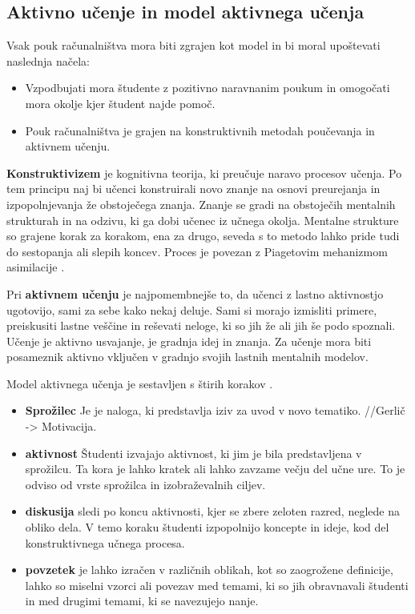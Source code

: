 \subsection{Aktivno učenje in model aktivnega učenja}
\label{sec:aktivno_učenje_in_model_aktivnega_učenja}

Vsak pouk računalništva mora biti zgrajen kot model in bi moral
upoštevati naslednja načela:
\begin{itemize}
\tightlist
\item Vzpodbujati mora študente z pozitivno naravnanim poukum in
   omogočati mora okolje kjer študent najde pomoč.
 \item Pouk računalništva je grajen na konstruktivnih metodah poučevanja
   in aktivnem učenju.
\end{itemize}

\textbf{Konstruktivizem} je kognitivna teorija, ki preučuje naravo
procesov učenja. Po tem principu naj bi učenci konstruirali novo
znanje na osnovi preurejanja in izpopolnjevanja že obstoječega
znanja. Znanje se gradi na obstoječih mentalnih strukturah in na
odzivu, ki ga dobi učenec iz učnega okolja. Mentalne strukture so
grajene korak za korakom, ena za drugo, seveda s to metodo lahko pride
tudi do sestopanja ali slepih koncev. Proces je povezan z Piagetovim
mehanizmom asimilacije \cite{guideTCS}.

Pri \textbf{aktivnem učenju} je najpomembnejše to, da učenci z lastno
aktivnostjo ugotovijo, sami za sebe kako nekaj deluje. Sami si morajo
izmisliti primere, preiskusiti lastne veščine in reševati neloge, ki
so jih že ali jih še podo spoznali. Učenje je aktivno usvajanje, je
gradnja idej in znanja. Za učenje mora biti posameznik aktivno
vključen v gradnjo svojih lastnih mentalnih modelov.

Model aktivnega učenja je sestavljen s štirih korakov \cite{guideTCS}.

\begin{itemize}
\tightlist
\item \textbf{Sprožilec} Je je naloga, ki predstavlja  iziv za uvod v novo
tematiko.  //Gerlič -> Motivacija.
\item \textbf{aktivnost} Študenti izvajajo aktivnost, ki jim je bila
predstavljena v sprožilcu. Ta kora je lahko kratek ali lahko
zavzame večju del učne ure. To je odviso od vrste sprožilca in
izobraževalnih ciljev.
\item \textbf{diskusija} sledi po koncu aktivnosti, kjer se zbere zeloten
razred, neglede na obliko dela. V temo koraku študenti izpopolnijo
koncepte in ideje, kod del konstruktivnega učnega procesa.
\item \textbf{povzetek} je lahko izračen v različnih oblikah, kot so
zaogrožene definicije, lahko so miselni vzorci ali povezav med
temami, ki so jih obravnavali študenti in med drugimi temami, ki se
navezujejo nanje.
\end{itemize}

